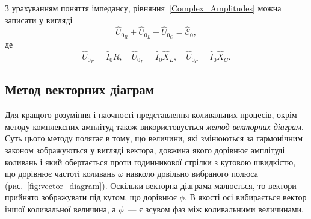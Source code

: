 З урахуванням поняття імпедансу, рівняння~\eqref{Complex_Amplitudes} можна записати у вигляді
\begin{equation}\label{eq:S_sumU}
	\hat{U}_{0_R} + \hat{U}_{0_L} + \hat{U}_{0_C} = \hat{\mathcal{E}}_{0},
\end{equation}
де
\begin{equation}\label{eq:U}
	\hat{U}_{0_R} = \hat{I}_{0} R, \quad \hat{U}_{0_L} = \hat{I}_{0} \hat{X}_L, \quad \hat{U}_{0_C} = \hat{I}_{0} \hat{X}_C.
\end{equation}


\subsection{Метод векторних діаграм}

Для кращого розуміння і наочності представлення коливальних процесів, окрім методу комплексних амплітуд також використовується \emph{метод векторних діаграм}. Суть цього методу полягає в тому, що величини, які змінюються за гармонічним законом зображуються у вигляді вектора, довжина якого дорівнює амплітуді коливань і який обертається проти годинникової стрілки з кутовою швидкістю, що дорівнює частоті коливань $\omega$ навколо довільно вибраного полюса (рис.~\ref{fig:vector_diagram}). Оскільки векторна діаграма малюється, то вектори прийнято зображувати під кутом, що дорівнює $\phi$. В якості осі вибирається вектор іншої коливальної величина, а $\phi$~--- є зсувом фаз між коливальними величинами. 

